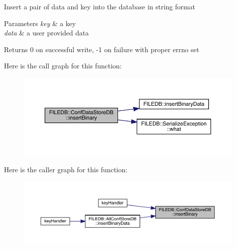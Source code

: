Insert a pair of data and key into the database in string format 
\begin{DoxyParams}{Parameters}
{\em key} & a key \\
\hline
{\em data} & a user provided data\\
\hline
\end{DoxyParams}
\begin{DoxyReturn}{Returns}
0 on successful write, -\/1 on failure with proper errno set 
\end{DoxyReturn}
Here is the call graph for this function\+:
\nopagebreak
\begin{figure}[H]
\begin{center}
\leavevmode
\includegraphics[width=350pt]{d8/d19/classFILEDB_1_1ConfDataStoreDB_a82fea8d8ac1a2c096614b213087a73d2_cgraph}
\end{center}
\end{figure}
Here is the caller graph for this function\+:\nopagebreak
\begin{figure}[H]
\begin{center}
\leavevmode
\includegraphics[width=350pt]{d8/d19/classFILEDB_1_1ConfDataStoreDB_a82fea8d8ac1a2c096614b213087a73d2_icgraph}
\end{center}
\end{figure}
\mbox{\label{classFILEDB_1_1ConfDataStoreDB_a8fa05198f3ff1f405fbdfc6a51f43d1a}} 
